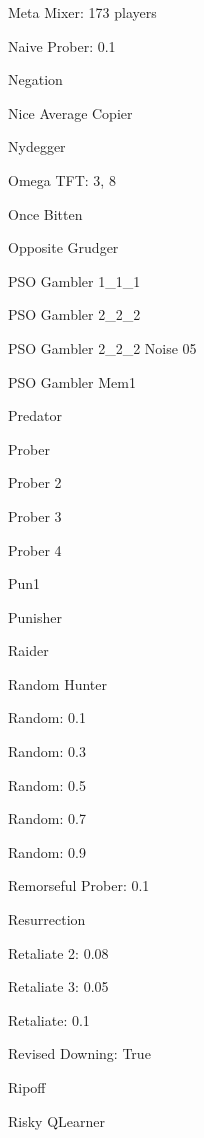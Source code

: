 \item Meta Mixer: 173 players\cite{axelrodproject}
\item Naive Prober: 0.1 \cite{Li2011}
\item Negation \cite{PD2017}
\item Nice Average Copier\cite{axelrodproject}
\item Nydegger~\cite{Axelrod1980a}
\item Omega TFT: 3, 8~\cite{kendall2007iterated}
\item Once Bitten~\cite{axelrodproject}
\item Opposite Grudger~\cite{axelrodproject}
\item PSO Gambler 1\_1\_1\cite{axelrodproject}
\item PSO Gambler 2\_2\_2\cite{axelrodproject}
\item PSO Gambler 2\_2\_2 Noise 05\cite{axelrodproject}
\item PSO Gambler Mem1 \cite{axelrodproject}
\item Predator~\cite{Ashlock2006}
\item Prober~\cite{Li2011}
\item Prober 2~\cite{prison}
\item Prober 3~\cite{prison}
\item Prober 4~\cite{prison}
\item Pun1~\cite{Ashlock2006}
\item Punisher~\cite{axelrodproject}
\item Raider~\cite{Ashlock2014}
\item Random Hunter~\cite{axelrodproject}
\item Random: 0.1 
\item Random: 0.3 
\item Random: 0.5~\cite{Axelrod1980a, Tzafestas2000}
\item Random: 0.7 
\item Random: 0.9 
\item Remorseful Prober: 0.1 ~ \cite{Li2011}
\item Resurrection~\cite{Eckhart2015}
\item Retaliate 2: 0.08~\cite{axelrodproject}
\item Retaliate 3: 0.05~\cite{axelrodproject}
\item Retaliate: 0.1~\cite{axelrodproject}
\item Revised Downing: True~\cite{Axelrod1980a}
\item Ripoff~\cite{Ashlock2008}
\item Risky QLearner\cite{axelrodproject}
